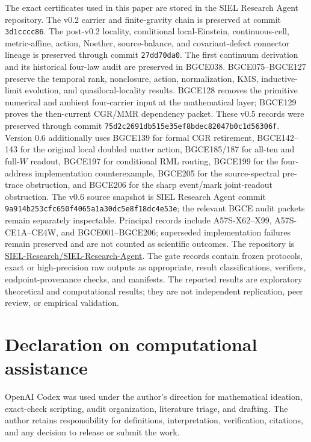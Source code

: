 \documentclass[11pt]{article}
\theoremstyle{definition}
\theoremstyle{remark}
\begin{document}
The exact certificates used in this paper are stored in the SIEL Research Agent repository. The v0.2 carrier and finite-gravity chain is preserved at commit \texttt{3d1cccc86}. The post-v0.2 locality, conditional local-Einstein, continuous-cell, metric-affine, action, Noether, source-balance, and covariant-defect connector lineage is preserved through commit \texttt{27dd70da0}. The first continuum derivation and its historical four-law audit are preserved in BGCE038. BGCE075--BGCE127 preserve the temporal rank, nonclosure, action, normalization, KMS, inductive-limit evolution, and quasilocal-locality results. BGCE128 removes the primitive numerical and ambient four-carrier input at the mathematical layer; BGCE129 proves the then-current CGR/MMR dependency packet. These v0.5 records were preserved through commit \texttt{75d2c2691db515e35ef8bdec82047b0c1d56306f}. Version 0.6 additionally uses BGCE139 for formal CGR retirement, BGCE142--143 for the original local doubled matter action, BGCE185/187 for all-ten and full-$W$ readout, BGCE197 for conditional RML routing, BGCE199 for the four-address implementation counterexample, BGCE205 for the source-spectral pre-trace obstruction, and BGCE206 for the sharp event/mark joint-readout obstruction. The v0.6 source snapshot is SIEL Research Agent commit \texttt{9a914b253cfc650f4065a1a30dc5e8f18dc4e53e}; the relevant BGCE audit packets remain separately inspectable. Principal records include A57S-X62--X99, A57S-CE1A--CE4W, and BGCE001--BGCE206; superseded implementation failures remain preserved and are not counted as scientific outcomes. The repository is
\href{https://github.com/SIEL-Research/SIEL-Research-Agent}{SIEL-Research/SIEL-Research-Agent}.
The gate records contain frozen protocols, exact or high-precision raw outputs as appropriate, result classifications, verifiers, endpoint-provenance checks, and manifests. The reported results are exploratory theoretical and computational results; they are not independent replication, peer review, or empirical validation.

\section*{Declaration on computational assistance}

OpenAI Codex was used under the author's direction for mathematical ideation, exact-check scripting, audit organization, literature triage, and drafting. The author retains responsibility for definitions, interpretation, verification, citations, and any decision to release or submit the work.
\end{document}
